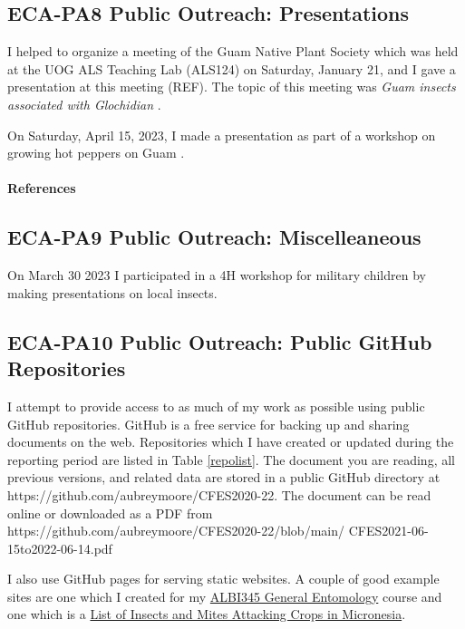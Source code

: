 \newpage
\subsection{ECA-PA8 Public Outreach: Presentations}
\begin{refsection}

I helped to organize a meeting of the Guam Native Plant Society which was held at the UOG ALS Teaching Lab (ALS124) on Saturday, January 21, and I gave a presentation at this meeting (REF). The topic of this meeting was \textit{Guam insects associated with \textit{Glochidian}} \cite{mooreGlochidion2023}.

On Saturday, April 15, 2023, I made a presentation as part of a workshop on growing hot peppers on Guam \cite{mooreInterestingFactsChili2023}.

\paragraph{References}
\printbibliography[heading=none]
\end{refsection}

\subsection{ECA-PA9 Public Outreach: Miscelleaneous}

On March 30 2023 I participated in a 4H workshop for military children by making presentations on local insects.

\subsection{ECA-PA10 Public Outreach: Public GitHub Repositories}

I attempt to provide access to as much of my work as possible using public GitHub repositories. GitHub is a free service for backing up and sharing documents on the web. Repositories which I have created or updated during the reporting period are listed in Table \ref{repolist}.  The document you
are reading, all previous versions, and related data are stored in a public GitHub directory
at
https://github.com/aubreymoore/CFES2020-22. The document can be read online or
downloaded as a PDF from
https://github.com/aubreymoore/CFES2020-22/blob/main/
CFES2021-06-15to2022-06-14.pdf

I also use GitHub pages for serving static websites. A couple of good example sites are one which I created for my \href{https://aubreymoore.github.io/ALBI-345/}{ALBI345 General Entomology} course and one which is a \href{https://aubreymoore.github.io/crop-pest-list/}{List of Insects and Mites Attacking Crops in Micronesia}.

